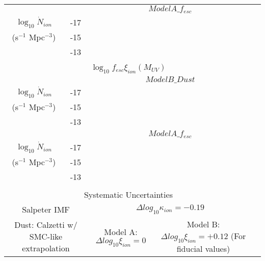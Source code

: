 \begin{table*}
\begin{tabular}{cc|cccccc}
	  & & \multicolumn{5}{c}{$ModelA\_f_{esc}$}\\
	  
$\log_{10} \dot{N}_{ion}$	 		& -17 &  \\
(s$^{-1}$ Mpc$^{-3}$) 				& -15 &  \\
												& -13 &  \\											

	 \multicolumn{7}{c}{}\\
	 \multicolumn{7}{c}{$\log_{10}f_{esc}\xi_{ion}(M_{UV})$}\\\hline
	 
	  & & \multicolumn{5}{c}{$ModelB\_Dust$}\\
	  
$\log_{10} \dot{N}_{ion}$	 		& -17 &  \\
(s$^{-1}$ Mpc$^{-3}$) 				& -15 &  \\
												& -13 &  \\
												
	  & & \multicolumn{5}{c}{$ModelA\_f_{esc}$}\\
	  
$\log_{10} \dot{N}_{ion}$	 		& -17 &  \\
(s$^{-1}$ Mpc$^{-3}$) 				& -15 &  \\
												& -13 &  \\		

	 \multicolumn{7}{c}{}\\
	 \multicolumn{7}{c}{Systematic Uncertainties}\\\hline
	 \multicolumn{2}{c}{Salpeter IMF} & \multicolumn{5}{c}{$\Delta log_{10}\kappa_{ion} = -0.19$}\\
	 \multicolumn{2}{c}{Dust: Calzetti w/ SMC-like extrapolation} &  \multicolumn{2}{c}{Model A: $\Delta log_{10}\xi_{ion} = 0$} & \multicolumn{3}{c}{Model B: $\Delta log_{10}\xi_{ion} = +0.12$ (For fiducial values)}\\



  \end{tabular}
\end{table*}


